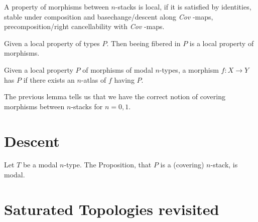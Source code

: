 \documentclass{article}
\newcommand{\Cov}{\emph{Cov} }
\begin{document}
\begin{definition}
    A property of morphisms between  $n$-stacks is local, if it is satisfied by identities, stable under composition and basechange/descent along \Cov-maps, precomposition/right cancellability with \Cov-maps.
\end{definition}
\begin{lemma}
    Given a local property of types $P$. Then beeing fibered in $P$ is a local property of morphisms.
\end{lemma}
\begin{lemma}
    Given a local property $P$ of morphisms of modal $n$-types, a morphism $f : X \to Y$ has $P$ if there exists an $n$-atlas of $f$ having $P$.
\end{lemma}
The previous lemma tells us that we have the correct notion of covering morphisms between  $n$-stacks for $n = 0,1$.
\section{Descent}
 \begin{theorem}{\label{thm:descent}}
     Let $T$ be a modal $n$-type. The Proposition, that $P$ is a  (covering) $n$-stack, is modal.
 \end{theorem}


\section{Saturated Topologies revisited}
\end{document}
